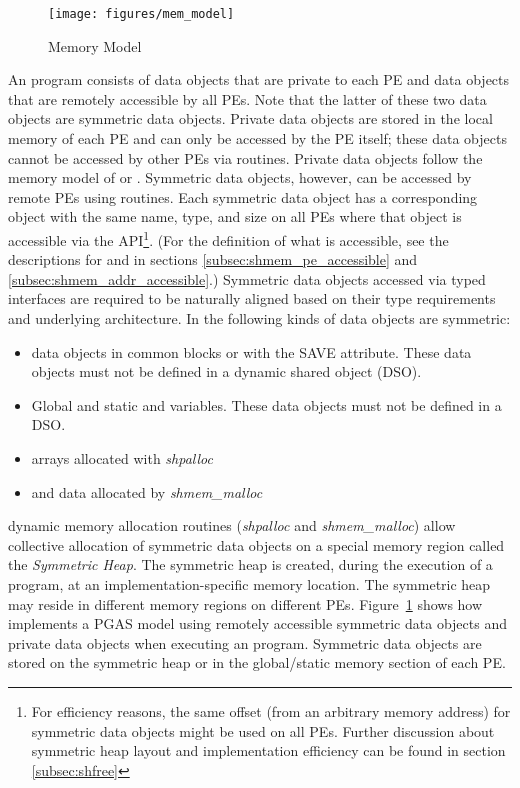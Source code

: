 \begin{figure}[h]
\texttt{[image: figures/mem\_model]}      
\caption{\openshmem Memory Model}
\label{fig:mem_model}                                               
\end{figure}      
%
An \openshmem program consists of data objects that are private to each \ac{PE}
and data  objects that are remotely accessible by all \acp{PE}. Note that the latter 
of these two data objects are symmetric data objects. Private data
objects are stored in the local memory of each \ac{PE} and can only be accessed
by the \ac{PE} itself; these data objects cannot be accessed by other \acp{PE}
via \openshmem routines. Private data objects follow the memory model of
\Cstd or \Fortran. Symmetric data objects, however, can be accessed by
remote \acp{PE} using \openshmem routines. Each symmetric data object has a
corresponding object with the same name, type, and size on all PEs where that object is
accessible via the \openshmem \ac{API}\footnote{For efficiency reasons,
the same offset (from an arbitrary memory address) for symmetric data
objects might be used on all \acp{PE}. Further discussion about symmetric heap
layout and implementation efficiency can be found in section
\ref{subsec:shfree}}.  (For the definition of what is accessible, see the
descriptions for  and 
in sections \ref{subsec:shmem_pe_accessible} and
\ref{subsec:shmem_addr_accessible}.) Symmetric data objects accessed via typed
\openshmem interfaces are required to be naturally aligned based on their type
requirements and underlying architecture.  In \openshmem the following kinds of
data objects are symmetric:
%
\begin{itemize}
  \item \Fortran data objects in common blocks or with the  SAVE  attribute.
      These data objects must not be defined in a dynamic shared object (DSO).
  \item Global and static \Cstd and \Cpp variables. These data objects must
      not  be defined in a DSO.
  \item \Fortran arrays allocated with \textit{shpalloc} 
  \item \Cstd and \Cpp data allocated by \textit{shmem\_malloc}
\end{itemize}       

\openshmem dynamic memory allocation routines (\textit{shpalloc} and
\textit{shmem\_malloc}) allow collective allocation of symmetric data objects
on a special memory region called the \emph{Symmetric Heap}. The
symmetric heap is created, during the execution of a program, at an 
implementation-specific memory location. The symmetric heap may reside in different
memory regions on different \acp{PE}. Figure~\ref{fig:mem_model} shows how
\openshmem implements a \ac{PGAS} model using remotely accessible symmetric data
objects and private data objects when executing an \openshmem program.
Symmetric data objects are stored on the symmetric heap or in the global/static
memory section of each \ac{PE}. 
